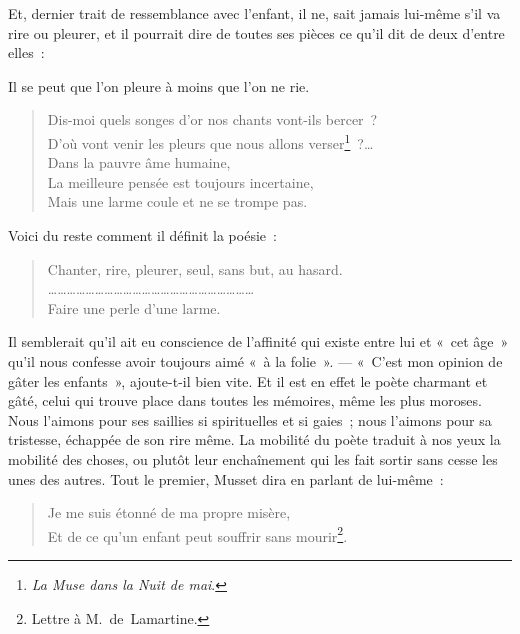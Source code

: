 \documentclass[french,twoside]{book} %
\begin{document}
\noindent Et, dernier trait de ressemblance avec l’enfant, il ne, sait jamais lui-même s’il va rire ou pleurer, et il pourrait dire de toutes ses pièces ce qu’il dit de deux d’entre elles :\par
Il se peut que l’on pleure à moins que l’on ne rie.\par


\begin{verse}
Dis-moi quels songes d’or nos chants vont-ils bercer ?\\
D’où vont venir les pleurs que nous allons verser\footnote{\emph{La Muse dans la Nuit de mai}.} ?…\\
Dans la pauvre âme humaine,\\
La meilleure pensée est toujours incertaine,\\
Mais une larme coule et ne se trompe pas.\\
\end{verse}

\noindent Voici du reste comment il définit la poésie :\par


\begin{verse}
Chanter, rire, pleurer, seul, sans but, au hasard.\\
…………………………………………………………\\
Faire une perle d’une larme.\\
\end{verse}

\noindent Il semblerait qu’il ait eu conscience de l’affinité qui existe entre lui et « cet âge » qu’il nous confesse avoir toujours aimé « à la folie ». — « C’est mon opinion de gâter les enfants », ajoute-t-il bien vite. Et il est en effet le poète charmant et gâté, celui qui trouve place dans toutes les mémoires, même les plus moroses. Nous l’aimons pour ses saillies si spirituelles et si gaies ; nous l’aimons pour sa tristesse, échappée de son rire même. La mobilité du poète traduit à nos yeux la mobilité des choses, ou plutôt leur enchaînement qui les fait sortir sans cesse les unes des autres. Tout le premier, Musset dira en parlant de lui-même :\par


\begin{verse}
Je me suis étonné de ma propre misère,\\
Et de ce qu’un enfant peut souffrir sans mourir\footnote{Lettre à M. de Lamartine.}.\\
\end{verse}
\end{document}

